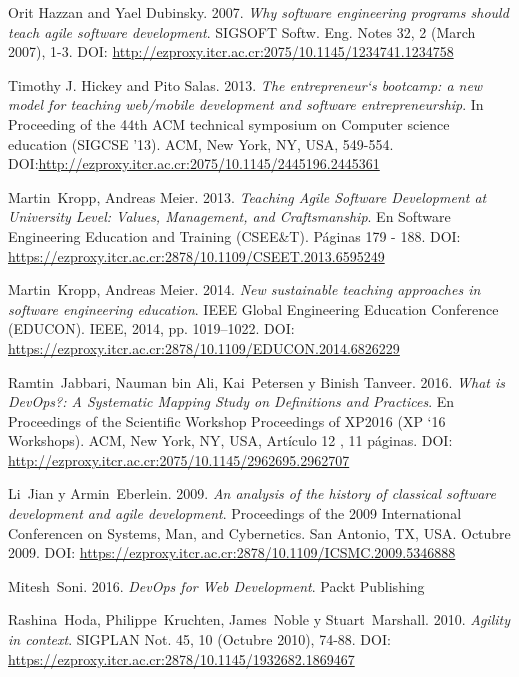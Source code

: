 \documentclass[journal]{IEEEtran}
\begin{document}
\begin{thebibliography}{1}
Orit Hazzan and Yael Dubinsky. 2007. \emph{Why software engineering programs should teach agile software development}. SIGSOFT Softw. Eng. Notes 32, 2 (March 2007), 1-3. DOI: \url{http://ezproxy.itcr.ac.cr:2075/10.1145/1234741.1234758}

Timothy J. Hickey and Pito Salas. 2013. \emph{The entrepreneur`s bootcamp: a new model for teaching web/mobile development and software entrepreneurship}. In Proceeding of the 44th ACM technical symposium on Computer science education (SIGCSE '13). ACM, New York, NY, USA, 549-554. DOI:\url{http://ezproxy.itcr.ac.cr:2075/10.1145/2445196.2445361}

Martin~Kropp, Andreas Meier. 2013. \emph{Teaching Agile Software Development at University Level: Values, Management, and Craftsmanship}. En Software Engineering Education and Training (CSEE\&T). Páginas 179 - 188. DOI: \url{https://ezproxy.itcr.ac.cr:2878/10.1109/CSEET.2013.6595249}

Martin~Kropp, Andreas Meier. 2014. \emph{New sustainable teaching approaches in software engineering education}. IEEE Global Engineering Education Conference (EDUCON). IEEE, 2014, pp. 1019–1022. DOI: \url{https://ezproxy.itcr.ac.cr:2878/10.1109/EDUCON.2014.6826229}

Ramtin~Jabbari, Nauman bin Ali, Kai~Petersen y Binish Tanveer. 2016. \emph{What is DevOps?: A Systematic Mapping Study on Definitions and Practices}. En Proceedings of the Scientific Workshop Proceedings of XP2016 (XP `16 Workshops). ACM, New York, NY, USA, Artículo 12 , 11 páginas. DOI: \url{http://ezproxy.itcr.ac.cr:2075/10.1145/2962695.2962707}

Li~Jian y Armin~Eberlein. 2009. \emph{An analysis of the history of classical software development and agile development}. Proceedings of the 2009 International Conferencen on Systems, Man, and Cybernetics. San Antonio, TX, USA. Octubre 2009. DOI: \url{https://ezproxy.itcr.ac.cr:2878/10.1109/ICSMC.2009.5346888}

Mitesh~Soni. 2016. \emph{DevOps for Web Development}. Packt Publishing 

Rashina~Hoda, Philippe~Kruchten, James~Noble y Stuart~Marshall. 2010. \emph{Agility in context}. SIGPLAN Not. 45, 10 (Octubre 2010), 74-88. DOI: \url{https://ezproxy.itcr.ac.cr:2878/10.1145/1932682.1869467}


\end{thebibliography}
\end{document}

